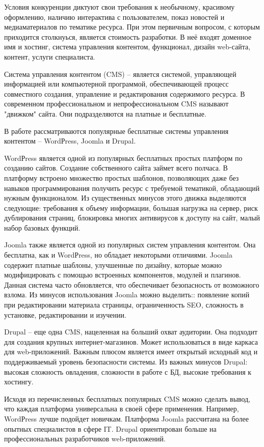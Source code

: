 Условия конкуренции диктуют свои требования к необычному, красивому оформлению, наличию интерактива с пользователем, показ новостей и медиаматериалов по тематике ресурса.
При этом первичным вопросом, с которым приходится столкнуься, является стоимость разработки.
В неё входят доменное имя и хостинг, система управления контентом, функционал, дизайн web-сайта, контент, услуги специалиста.

Система управления контентом (CMS) -- является системой, управляющей информацией или компьютерной программой, обеспечивающей процесс совместного создания, управление и редактирования содержимого ресурса.
В современном профессиональном и непрофессиональном CMS называют "движком" сайта.
Они подразделяются на платные и бесплатные.

В работе рассматриваются популярные бесплатные системы управления контентом -- WordРress, Joomla
и Drupal.

WordРress является одной из популярных бесплатных простых платформ по созданию сайтов.
Создание собственного сайта займет всего полчаса.
В платформу встроено множество простых шаблонов, позволяющих даже без навыков программирования получить ресурс с требуемой тематикой, обладающий нужным функционалом.
Из существенных минусов этого движка выделяются следующие: требования к объему информации, большая нагрузка на сервер, риск дублирования страниц, блокировка многих антивирусов к доступу на сайт, малый набор базовых функций.

Joomla также является одной из популярных систем управления контентом.
Она бесплатна, как и WordРress, но обладает некоторыми отличиями.
Joomla содержит платные шаблоны, улучшенные по дизайну, которые можно модифицировать с помощью встроенных компонентов, модулей и плагинов.
Данная система часто обновляется, что обеспечивает безопасность от возможного взлома.
Из минусов использования Joomla можно выделить:: появление копий при редактировании материала страницы, ограниченность SEO, сложность в установке, редактировании и изучении.

Drupal -- еще одна CMS, нацеленная на больший охват аудитории.
Она подходит для создания крупных интернет-магазинов.
Может использоваться в виде каркаса для web-приложений.
Важным плюсом является имеет открытый исходный код и поддерживаемый уровень безопасности системы.
Из важных минусов Drupal: высокая сложность овладения, сложности в работе с БД, высокие требования к хостингу.

Исходя из перечисленных бесплатных популярных CMS можно сделать вывод, что каждая платформа универсальна в своей сфере применения.
Например, WordРress лучше подойдет новичкам.
Платформа Joomla рассчитана на более опытных специалистов в сфере IT.
Drupal ориентирован больше на профессиональных разработчиков web-приложений. 

